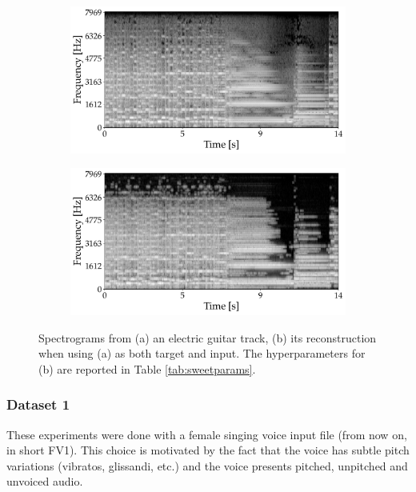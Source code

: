 \begin{figure}[t]
	\centering
	\begin{subfigure}[b]{0.5\textwidth}
		\includegraphics[width=\textwidth]{img/audioXsynth/plots/specgram_orig-Child}
	\end{subfigure}
	\hfil
	\begin{subfigure}[b]{0.5\textwidth}
		\includegraphics[width=\textwidth]{img/audioXsynth/plots/specgram_selfcodingChild}
	\end{subfigure}
	
	
	\caption{Spectrograms from (a) an electric guitar track, (b) its reconstruction when using (a) as both target and input. The hyperparameters for (b) are reported in Table \ref{tab:sweetparams}.}
	\label{fig:same}
\end{figure}

\subsubsection{Dataset 1}

These experiments were done with a female singing voice input file (from now on, in short FV1). This choice is motivated by the fact that the voice has subtle pitch variations (vibratos, glissandi, etc.) and the voice presents pitched, unpitched and unvoiced audio. 

